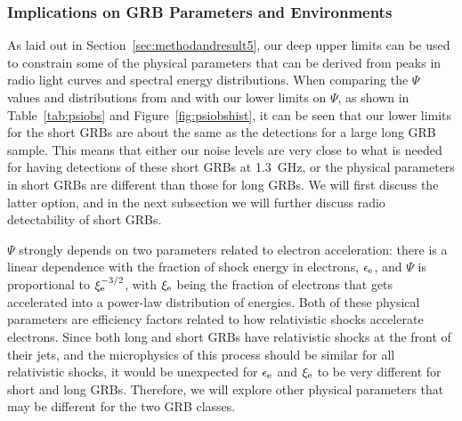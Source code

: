 \documentclass[12pt]{article}
\begin{document}
\subsubsection{Implications on GRB Parameters and Environments}

As laid out in Section~\ref{sec:methodandresult5}, our deep upper limits can be used to constrain some of the physical parameters that can be derived from peaks in radio light curves and spectral energy distributions. When comparing the $\Psi$ values and distributions from \citet{2017MNRAS.472.3161B} and \citet{2023MNRAS.518.1522D} with our lower limits on $\Psi$, as shown in Table~\ref{tab:psiobs} and Figure~\ref{fig:psiobshist}, it can be seen that our lower limits for the short GRBs are about the same as the detections for a large long GRB sample. This means that either our noise levels are very close to what is needed for having detections of these short GRBs at 1.3~GHz, or the physical parameters in short GRBs are different than those for long GRBs. We will first discuss the latter option, and in the next subsection we will further discuss radio detectability of short GRBs.

$\Psi$ strongly depends on two parameters related to electron acceleration: there is a linear dependence with the fraction of shock energy in electrons, $\epsilon_{\rm{e}}$, and $\Psi$ is proportional to $\xi_{\rm{e}}^{-3/2}$, with $\xi_{\rm{e}}$ being the fraction of electrons that gets accelerated into a power-law distribution of energies. Both of these physical parameters are efficiency factors related to how relativistic shocks accelerate electrons. Since both long and short GRBs have relativistic shocks at the front of their jets, and the microphysics of this process should be similar for all relativistic shocks, it would be unexpected for $\epsilon_{\rm{e}}$ and $\xi_{\rm{e}}$ to be very different for short and long GRBs. Therefore, we will explore other physical parameters that may be different for the two GRB classes.
\end{document}
